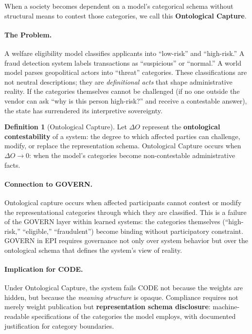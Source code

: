 \documentclass[11pt,a4paper]{article}
\theoremstyle{definition}
\newtheorem{definition}{Definition}[section]
\begin{document}
When a society becomes dependent on a model's categorical schema without structural means to contest those categories, we call this \textbf{Ontological Capture}.

\paragraph{The Problem.} A welfare eligibility model classifies applicants into ``low-risk'' and ``high-risk.'' A fraud detection system labels transactions as ``suspicious'' or ``normal.'' A world model parses geopolitical actors into ``threat'' categories. These classifications are not neutral descriptions; they are \textit{definitional acts} that shape administrative reality. If the categories themselves cannot be challenged (if no one outside the vendor can ask ``why is this person high-risk?'' and receive a contestable answer), the state has surrendered its interpretive sovereignty.

\begin{definition}[Ontological Capture]
\label{def:ontological-capture}
Let $\Delta O$ represent the \textbf{ontological contestability} of a system: the degree to which affected parties can challenge, modify, or replace the representation schema. Ontological Capture occurs when $\Delta O \to 0$: when the model's categories become non-contestable administrative facts.
\end{definition}

\paragraph{Connection to GOVERN.} Ontological capture occurs when affected participants cannot contest or modify the representational categories through which they are classified. This is a failure of the GOVERN layer within learned systems: the categories themselves (``high-risk,'' ``eligible,'' ``fraudulent'') become binding without participatory constraint. GOVERN in EPI requires governance not only over system behavior but over the ontological schema that defines the system's view of reality.

\paragraph{Implication for CODE.} Under Ontological Capture, the system fails CODE not because the weights are hidden, but because the \textit{meaning structure} is opaque. Compliance requires not merely weight publication but \textbf{representation schema disclosure}: machine-readable specifications of the categories the model employs, with documented justification for category boundaries.
\end{document}
